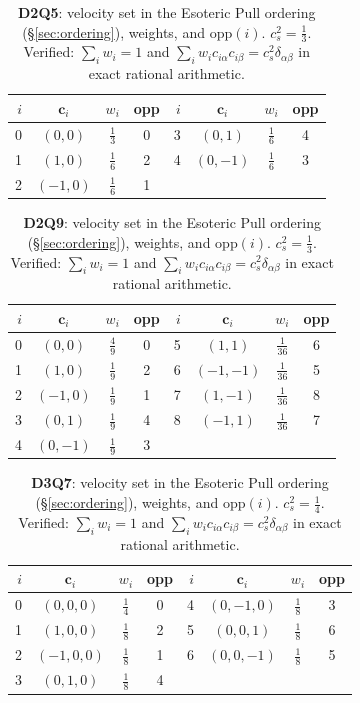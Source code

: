 \documentclass[11pt,a4paper]{article}
\newcommand{\cs}{c_s}
\newcommand{\ci}{\bm{c}_i}
\begin{document}
\begin{table}[t]
\centering\small
\begin{tabular}{r c c c r c c c }
\toprule
$i$ & $\ci$ & $w_i$ & opp & $i$ & $\ci$ & $w_i$ & opp \\
\midrule
0 & $(0,0)$ & $\tfrac{1}{3}$ & 0 & 3 & $(0,1)$ & $\tfrac{1}{6}$ & 4 \\
1 & $(1,0)$ & $\tfrac{1}{6}$ & 2 & 4 & $(0,-1)$ & $\tfrac{1}{6}$ & 3 \\
2 & $(-1,0)$ & $\tfrac{1}{6}$ & 1 &  & & &  \\
\bottomrule
\end{tabular}
\caption{\textbf{D2Q5}: velocity set in the Esoteric Pull ordering
(\S\ref{sec:ordering}), weights, and $\mathrm{opp}(i)$. $\cs^2=\tfrac{1}{3}$.
Verified: $\sum_i w_i=1$ and $\sum_i w_i c_{i\alpha}c_{i\beta}=\cs^2\delta_{\alpha\beta}$
in exact rational arithmetic.}
\end{table}

\begin{table}[t]
\centering\small
\begin{tabular}{r c c c r c c c }
\toprule
$i$ & $\ci$ & $w_i$ & opp & $i$ & $\ci$ & $w_i$ & opp \\
\midrule
0 & $(0,0)$ & $\tfrac{4}{9}$ & 0 & 5 & $(1,1)$ & $\tfrac{1}{36}$ & 6 \\
1 & $(1,0)$ & $\tfrac{1}{9}$ & 2 & 6 & $(-1,-1)$ & $\tfrac{1}{36}$ & 5 \\
2 & $(-1,0)$ & $\tfrac{1}{9}$ & 1 & 7 & $(1,-1)$ & $\tfrac{1}{36}$ & 8 \\
3 & $(0,1)$ & $\tfrac{1}{9}$ & 4 & 8 & $(-1,1)$ & $\tfrac{1}{36}$ & 7 \\
4 & $(0,-1)$ & $\tfrac{1}{9}$ & 3 &  & & &  \\
\bottomrule
\end{tabular}
\caption{\textbf{D2Q9}: velocity set in the Esoteric Pull ordering
(\S\ref{sec:ordering}), weights, and $\mathrm{opp}(i)$. $\cs^2=\tfrac{1}{3}$.
Verified: $\sum_i w_i=1$ and $\sum_i w_i c_{i\alpha}c_{i\beta}=\cs^2\delta_{\alpha\beta}$
in exact rational arithmetic.}
\end{table}

\begin{table}[t]
\centering\small
\begin{tabular}{r c c c r c c c }
\toprule
$i$ & $\ci$ & $w_i$ & opp & $i$ & $\ci$ & $w_i$ & opp \\
\midrule
0 & $(0,0,0)$ & $\tfrac{1}{4}$ & 0 & 4 & $(0,-1,0)$ & $\tfrac{1}{8}$ & 3 \\
1 & $(1,0,0)$ & $\tfrac{1}{8}$ & 2 & 5 & $(0,0,1)$ & $\tfrac{1}{8}$ & 6 \\
2 & $(-1,0,0)$ & $\tfrac{1}{8}$ & 1 & 6 & $(0,0,-1)$ & $\tfrac{1}{8}$ & 5 \\
3 & $(0,1,0)$ & $\tfrac{1}{8}$ & 4 &  & & &  \\
\bottomrule
\end{tabular}
\caption{\textbf{D3Q7}: velocity set in the Esoteric Pull ordering
(\S\ref{sec:ordering}), weights, and $\mathrm{opp}(i)$. $\cs^2=\tfrac{1}{4}$.
Verified: $\sum_i w_i=1$ and $\sum_i w_i c_{i\alpha}c_{i\beta}=\cs^2\delta_{\alpha\beta}$
in exact rational arithmetic.}
\end{table}
\end{document}
